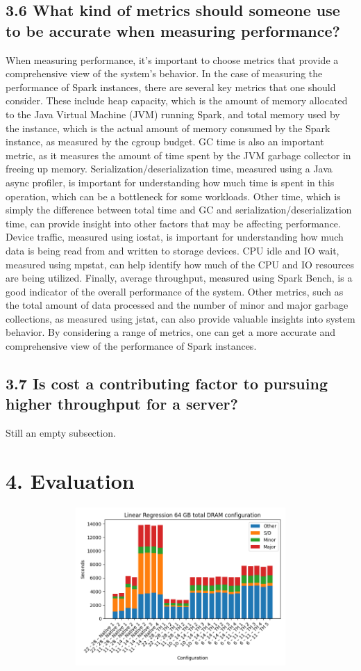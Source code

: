 \documentclass[twocolumn,10pt]{asme2e}
\begin{document}
\subsection*{3.6 What kind of metrics should someone use to be accurate when measuring performance?}
When measuring performance, it's important to choose metrics that provide a comprehensive view of the system's behavior. In the case of measuring the performance of Spark instances, there are several key metrics that one should consider. These include heap capacity, which is the amount of memory allocated to the Java Virtual Machine (JVM) running Spark, and total memory used by the instance, which is the actual amount of memory consumed by the Spark instance, as measured by the cgroup budget. GC time is also an important metric, as it measures the amount of time spent by the JVM garbage collector in freeing up memory. Serialization/deserialization time, measured using a Java async profiler, is important for understanding how much time is spent in this operation, which can be a bottleneck for some workloads. Other time, which is simply the difference between total time and GC and serialization/deserialization time, can provide insight into other factors that may be affecting performance. Device traffic, measured using iostat, is important for understanding how much data is being read from and written to storage devices. CPU idle and IO wait, measured using mpstat, can help identify how much of the CPU and IO resources are being utilized. Finally, average throughput, measured using Spark Bench, is a good indicator of the overall performance of the system. Other metrics, such as the total amount of data processed and the number of minor and major garbage collections, as measured using jstat, can also provide valuable insights into system behavior. By considering a range of metrics, one can get a more accurate and comprehensive view of the performance of Spark instances.

\subsection*{3.7 Is cost a contributing factor to pursuing higher throughput for a server?}
Still an empty subsection.

\section*{4. Evaluation}
\begin{figure}[h!]
	\includegraphics[width=13cm,height=6cm]{lr64.png}
\end{figure}
\end{document}
